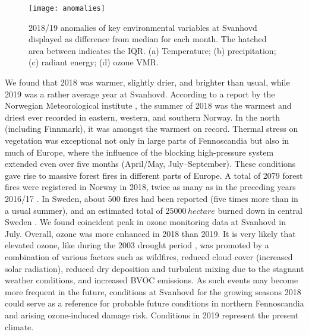 \documentclass[bg, manuscript]{copernicus}
\begin{document}
\begin{figure*}[t]
  
  \centering
  \texttt{[image: anomalies]}
  \caption{2018/19 anomalies of key environmental variables at Svanhovd displayed as difference from median for each month. The hatched area between indicates the IQR. (a) Temperature; (b) precipitation; (c) radiant energy; (d) ozone VMR.}
  \label{fig:anomalies_svanvik}
\end{figure*}

\label{sec:conc}

We found that 2018 was warmer, slightly drier, and brighter than usual, while 2019 was a rather average year at Svanhovd. According to a report by the Norwegian Meteorological institute \citep{MetNOR2019}, the summer of 2018 was the warmest and driest ever recorded in eastern, western, and southern Norway. In the north (including Finnmark), it was amongst the warmest on record. Thermal stress on vegetation was exceptional not only in large parts of Fennoscandia but also in much of Europe, where the influence of the blocking high-pressure system extended even over five months (April/May, July--September). These conditions gave rise to massive forest fires in different parts of Europe. A total of 2079 forest fires were registered in Norway in 2018, twice as many as in the preceding years 2016/17 \citep[last accessed April 2020]{DSB2019}. In Sweden, about 500 fires had been reported (five times more than in a usual summer), and an estimated total of $25000\,\unit{hectare}$ burned down in central Sweden \citep{SOU2019}. We found coincident peak  in ozone monitoring data at Svanhovd in July. Overall, ozone was more enhanced in 2018 than 2019. It is very likely that elevated ozone, like during the 2003 drought period \citep{JGR:Solberg2018}, was promoted by a combination of various factors such as wildfires, reduced cloud cover (increased solar radiation), reduced dry deposition and turbulent mixing due to the stagnant weather conditions, and increased BVOC emissions. As such events may become more frequent in the future, conditions at Svanhovd for the growing seasons 2018 could serve as a reference for probable future conditions in northern Fennoscandia and arising ozone-induced damage risk. Conditions in 2019 represent the present climate.
\end{document}
